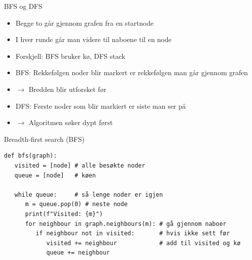 \begin{frame}{BFS og DFS}
\begin{itemize}[<+->]
\item Begge to går gjennom grafen fra en startnode
\item I hver runde går man videre til naboene til en node
\item Forskjell: BFS bruker kø, DFS stack
\item BFS: Rekkefølgen noder blir markert er rekkefølgen man går gjennom grafen
\item $\rightarrow$ Bredden blir utforsket før
\item DFS: Første noder som blir markiert er siste man ser på
\item $\rightarrow$ Algoritmen søker dypt først
\end{itemize}
\end{frame}

\begin{frame}[fragile]{Breadth-first search (BFS)}
\begin{verbatim}
def bfs(graph):
   visited = [node] # alle besøkte noder
   queue = [node]   # køen
	
   while queue:     # så lenge noder er igjen
      m = queue.pop(0) # neste node 
      print(f"Visited: {m}")
      for neighbour in graph.neighbours(m): # gå gjennom naboer
         if neighbour not in visited:       # hvis ikke sett før
            visited += neighbour            # add til visited og kø
            queue += neighbour
\end{verbatim}
\end{frame}


